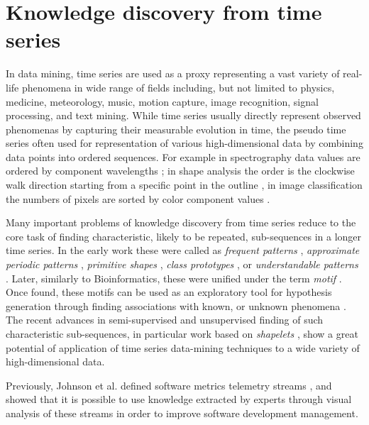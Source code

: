 \section{Knowledge discovery from time series}\label{section_knowledge_discovery}
In data mining, time series are used as a proxy representing a vast variety of real-life phenomena 
in wide range of fields including, but not limited to physics, medicine, meteorology, 
music, motion capture, image recognition, signal processing, and text mining. 
While time series usually directly represent observed phenomenas by capturing their measurable evolution in time, 
the pseudo time series often used for representation of various high-dimensional data 
by combining data points into ordered sequences. 
For example in spectrography data values are ordered by component wavelengths \cite{citeulike:12550833};
in shape analysis the order is the clockwise walk direction starting from a
specific point in the outline \cite{citeulike:12550835}, in image classification the numbers of pixels
are sorted by color component values \cite{citeulike:2900542}.

Many important problems of knowledge discovery from time series reduce to the core task of finding 
characteristic, likely to be repeated, sub-sequences in a longer time series. 
In the early work these were called as 
\textit{frequent patterns} \cite{citeulike:5159615}, 
\textit{approximate periodic patterns} \cite{citeulike:1959582},
\textit{primitive shapes} \cite{citeulike:5898869}, 
\textit{class prototypes} \cite{citeulike:4406444}, 
or \textit{understandable patterns} \cite{citeulike:3978076}. 
Later, similarly to Bioinformatics, these were unified under the term \textit{motif} \cite{citeulike:3977965}.
Once found, these motifs can be used as an exploratory tool for hypothesis generation through finding 
associations with known, or unknown phenomena \cite{citeulike:3977965}. 
The recent advances in semi-supervised and unsupervised finding of such characteristic sub-sequences, 
in particular work based on \textit{shapelets} \cite{citeulike:7344347} \cite{citeulike:11957982}
\cite{citeulike:12552293}, show a great potential of application of time series data-mining techniques 
to a wide variety of high-dimensional data.

Previously, Johnson et al. defined software metrics telemetry streams \cite{citeulike:12550871}, and 
showed that it is possible to use knowledge extracted by experts through visual analysis of these streams 
in order to improve software development management.
 
